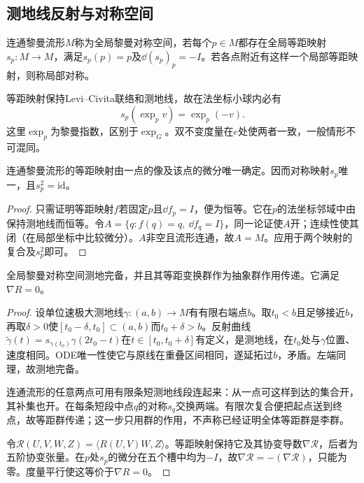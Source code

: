 \subsection{测地线反射与对称空间}
\begin{definition}
连通黎曼流形$M$称为全局黎曼对称空间，若每个$p\in M$都存在全局等距映射$s_p:M\to M$，满足$s_p(p)=p$及$\dd(s_p)_p=-I$。若各点附近有这样一个局部等距映射，则称局部对称。
\end{definition}
等距映射保持Levi--Civita联络和测地线，故在法坐标小球内必有
\begin{equation}\label{eq:lie-geodesic-reflection}
 s_p(\exp_pv)=\exp_p(-v).
\end{equation}
这里$\exp_p$为黎曼指数，区别于$\exp_G$。双不变度量在$e$处使两者一致，一般情形不可混同。

\begin{lemma}\label{lem:lie-isometry-rigidity}
连通黎曼流形的等距映射由一点的像及该点的微分唯一确定。因而对称映射$s_p$唯一，且$s_p^2=\mathrm{id}$。
\end{lemma}
\begin{proof}
只需证明等距映射$f$若固定$p$且$\dd f_p=I$，便为恒等。它在$p$的法坐标邻域中由保持测地线而恒等。令$A=\{q:f(q)=q,\ \dd f_q=I\}$，同一论证使$A$开；连续性使其闭（在局部坐标中比较微分）。$A$非空且流形连通，故$A=M$。应用于两个映射的复合及$s_p^2$即可。
\end{proof}

\begin{theorem}\label{thm:lie-symmetric-complete}
全局黎曼对称空间测地完备，并且其等距变换群作为抽象群作用传递。它满足$\nabla R=0$。
\end{theorem}
\begin{proof}
设单位速极大测地线$\gamma:(a,b)\to M$有有限右端点$b$。取$t_0<b$且足够接近$b$，再取$\delta>0$使$[t_0-\delta,t_0]\subset(a,b)$而$t_0+\delta>b$。反射曲线
$\widetilde\gamma(t)=s_{\gamma(t_0)}\gamma(2t_0-t)$在$t\in[t_0,t_0+\delta]$有定义，是测地线，在$t_0$处与$\gamma$位置、速度相同。ODE唯一性使它与原线在重叠区间相同，遂延拓过$b$，矛盾。左端同理，故测地完备。

连通流形的任意两点可用有限条短测地线段连起来：从一点可这样到达的集合开，其补集也开。在每条短段中点$q$的对称$s_q$交换两端。有限次复合便把起点送到终点，故等距群传递；这一步只用群的作用，不声称已经证明全体等距群是李群。

令$\mathcal R(U,V,W,Z)=\langle R(U,V)W,Z\rangle$。等距映射保持它及其协变导数$\nabla\mathcal R$，后者为五阶协变张量。在$p$处$s_p$的微分在五个槽中均为$-I$，故$\nabla\mathcal R=-(\nabla\mathcal R)$，只能为零。度量平行使这等价于$\nabla R=0$。
\end{proof}

